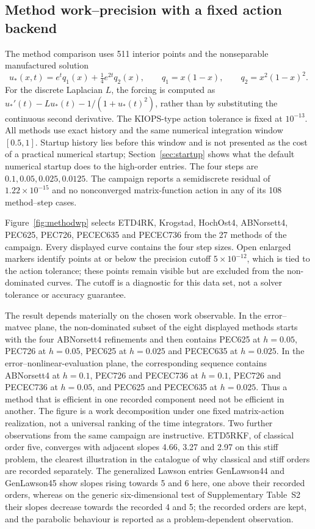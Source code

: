 \subsection{Method work--precision with a fixed action backend}\label{sec:methodwp}

The method comparison uses 511 interior points and the nonseparable
manufactured solution
\begin{equation}
 u_*(x,t)=e^t q_1(x)+\tfrac14 e^{2t}q_2(x),\qquad
 q_1=x(1-x),\qquad q_2=x^2(1-x)^2.
\end{equation}
For the discrete Laplacian $L$, the forcing is computed as
$u_*'(t)-Lu_*(t)-1/(1+u_*(t)^2)$, rather than by substituting the continuous
second derivative.  The KIOPS-type action tolerance is fixed at $10^{-13}$.
All methods use exact history and the same numerical integration window
$[0.5,1]$.  Startup history lies before this window and is not presented as
the cost of a practical numerical startup; Section~\ref{sec:startup} shows what
the default numerical startup does to the high-order entries.  The four steps
are $0.1,0.05,0.025,0.0125$.  The campaign reports a semidiscrete residual of
$1.22\times10^{-15}$ and no nonconverged matrix-function action in any of its
108 method--step cases.

Figure~\ref{fig:methodwp} selects ETD4RK, Krogstad, HochOst4, ABNorsett4,
PEC625, PEC726, PECEC635 and PECEC736 from the 27 methods of the campaign.
Every displayed curve contains the four step sizes.  Open enlarged markers
identify points at or below the precision cutoff $5\times10^{-12}$, which is
tied to the action tolerance; these points remain visible but are excluded
from the non-dominated curves.  The cutoff is a diagnostic for this data set,
not a solver tolerance or accuracy guarantee.

The result depends materially on the chosen work observable.  In the
error--matvec plane, the non-dominated subset of the eight displayed methods
starts with the four ABNorsett4 refinements and then contains PEC625 at
$h=0.05$, PEC726 at $h=0.05$, PEC625 at $h=0.025$ and PECEC635 at $h=0.025$.
In the error--nonlinear-evaluation plane, the corresponding sequence contains
ABNorsett4 at $h=0.1$, PEC726 and PECEC736 at $h=0.1$, PEC726 and PECEC736 at
$h=0.05$, and PEC625 and PECEC635 at $h=0.025$.  Thus a method that is
efficient in one recorded component need not be efficient in another.  The
figure is a work decomposition under one fixed matrix-action realization, not
a universal ranking of the time integrators.  Two further observations from
the same campaign are instructive.  ETD5RKF, of classical order five, converges
with adjacent slopes 4.66, 3.27 and 2.97 on this stiff problem, the clearest
illustration in the catalogue of why classical and stiff orders are recorded
separately.  The generalized Lawson entries GenLawson44 and GenLawson45 show
slopes rising towards 5 and 6 here, one above their recorded orders, whereas on
the generic six-dimensional test of Supplementary Table~S2 their slopes
decrease towards the recorded 4 and 5; the recorded orders are kept, and the
parabolic behaviour is reported as a problem-dependent observation.

